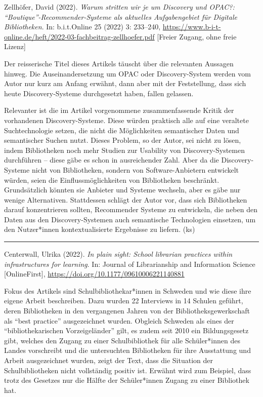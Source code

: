 \documentclass[a4paper,
fontsize=11pt,
oneside,
numbers=noperiodatend,
parskip=half-,
bibliography=totoc,
final
]{scrartcl}
\begin{document}
Zellhöfer, David (2022). \emph{Warum stritten wir je um Discovery und
OPAC?: \enquote{Boutique}-Recommender-Systeme als aktuelles
Aufgabengebiet für Digitale Bibliotheken}. In: b.i.t.Online 25 (2022) 3:
233--240,
\url{https://www.b-i-t-online.de/heft/2022-03-fachbeitrag-zellhoefer.pdf}
{[}Freier Zugang, ohne freie Lizenz{]}

Der reisserische Titel dieses Artikels täuscht über die relevanten
Aussagen hinweg. Die Auseinandersetzung um OPAC oder Discovery-System
werden vom Autor nur kurz am Anfang erwähnt, dann aber mit der
Feststellung, dass sich heute Discovery-Systeme durchgesetzt haben,
fallen gelassen.

Relevanter ist die im Artikel vorgenommene zusammenfassende Kritik der
vorhandenen Dis\-covery-Systeme. Diese würden praktisch alle auf eine
veraltete Suchtechnologie setzen, die nicht die Möglichkeiten
semantischer Daten und semantischer Suchen nutzt. Dieses Problem, so der
Autor, sei nicht zu lösen, indem Bibliotheken noch mehr Studien zur
Usability von Discovery-Systemen durchführen -- diese gäbe es schon in
ausreichender Zahl. Aber da die Discovery-Systeme nicht von
Bibliotheken, sondern von Software-Anbietern entwickelt würden, seien
die Einflussmöglichkeiten von Bibliotheken beschränkt. Grundsätzlich
könnten sie Anbieter und Systeme wechseln, aber es gäbe nur wenige
Alternativen. Stattdessen schlägt der Autor vor, dass sich Bibliotheken
darauf konzentrieren sollten, Recommender Systeme zu entwickeln, die
neben den Daten aus den Discovery-Systemen auch semantische Technologien
einsetzen, um den Nutzer*innen kontextualisierte Ergebnisse zu liefern.
(ks)

\begin{center}\rule{0.5\linewidth}{0.5pt}\end{center}

Centerwall, Ulrika (2022). \emph{In plain sight: School librarian
practices within infrastructures for learning}. In: Journal of
Librarianship and Information Science {[}OnlineFirst{]},
\url{https://doi.org/10.1177/09610006221140881}

Fokus des Artikels sind Schulbibliothekar*innen in Schweden und wie
diese ihre eigene Arbeit beschreiben. Dazu wurden 22 Interviews in 14
Schulen geführt, deren Bibliotheken in den vergangenen Jahren von der
Bibliotheksgewerkschaft als \enquote{best practice} ausgezeichnet
wurden. Obgleich Schweden als eines der \enquote{bibliothekarischen
Vorzeigeländer} gilt, es zudem seit 2010 ein Bildungsgesetz gibt,
welches den Zugang zu einer Schulbibliothek für alle Schüler*innen des
Landes vorschreibt und die untersuchten Bibliotheken für ihre
Ausstattung und Arbeit ausgezeichnet wurden, zeigt der Text, dass die
Situation der Schulbibliotheken nicht vollständig positiv ist. Erwähnt
wird zum Beispiel, dass trotz des Gesetzes nur die Hälfte der
Schüler*innen Zugang zu einer Bibliothek hat.
\end{document}
